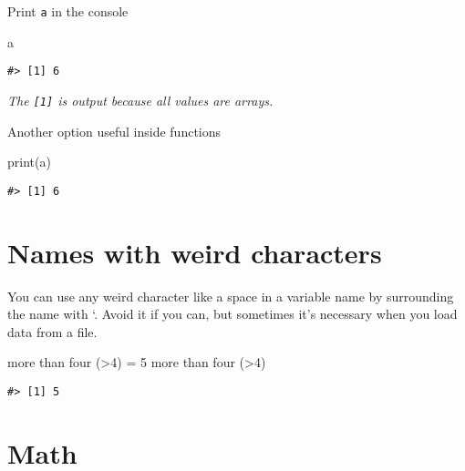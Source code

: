 \documentclass[
]{book}
\newenvironment{Shaded}{\begin{snugshade}}{\end{snugshade}}
\newcommand{\AttributeTok}[1]{\textcolor[rgb]{0.77,0.63,0.00}{#1}}
\newcommand{\DecValTok}[1]{\textcolor[rgb]{0.00,0.00,0.81}{#1}}
\newcommand{\FunctionTok}[1]{\textcolor[rgb]{0.00,0.00,0.00}{#1}}
\newcommand{\NormalTok}[1]{#1}
\newcommand{\OtherTok}[1]{\textcolor[rgb]{0.56,0.35,0.01}{#1}}
\newcommand{\StringTok}[1]{\textcolor[rgb]{0.31,0.60,0.02}{#1}}
\begin{document}
Print \texttt{a} in the console

\begin{Shaded}
\begin{Highlighting}[]
\NormalTok{a}
\end{Highlighting}
\end{Shaded}

\begin{verbatim}
#> [1] 6
\end{verbatim}

\emph{The \texttt{{[}1{]}} is output because all values are arrays.}

Another option useful inside functions

\begin{Shaded}
\begin{Highlighting}[]
\FunctionTok{print}\NormalTok{(a)}
\end{Highlighting}
\end{Shaded}

\begin{verbatim}
#> [1] 6
\end{verbatim}

\hypertarget{names-with-weird-characters}{%
\section{Names with weird characters}\label{names-with-weird-characters}}

You can use any weird character like a space in a variable name by surrounding the name with `. Avoid it if you can, but sometimes it's necessary when you load data from a file.

\begin{Shaded}
\begin{Highlighting}[]
\StringTok{\textasciigrave{}}\AttributeTok{more than four (\textgreater{}4)}\StringTok{\textasciigrave{}} \OtherTok{=} \DecValTok{5}
\StringTok{\textasciigrave{}}\AttributeTok{more than four (\textgreater{}4)}\StringTok{\textasciigrave{}}
\end{Highlighting}
\end{Shaded}

\begin{verbatim}
#> [1] 5
\end{verbatim}

\hypertarget{math}{%
\section{Math}\label{math}}
\end{document}
